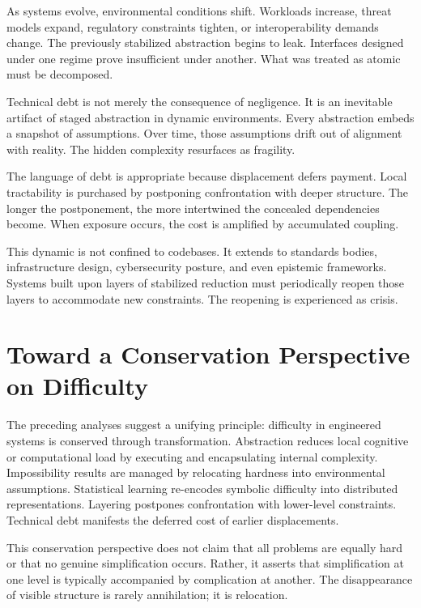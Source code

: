 \documentclass[11pt]{article}
\begin{document}
As systems evolve, environmental conditions shift. Workloads increase, threat models expand, regulatory constraints tighten, or interoperability demands change. The previously stabilized abstraction begins to leak. Interfaces designed under one regime prove insufficient under another. What was treated as atomic must be decomposed.

Technical debt is not merely the consequence of negligence. It is an inevitable artifact of staged abstraction in dynamic environments. Every abstraction embeds a snapshot of assumptions. Over time, those assumptions drift out of alignment with reality. The hidden complexity resurfaces as fragility.

The language of debt is appropriate because displacement defers payment. Local tractability is purchased by postponing confrontation with deeper structure. The longer the postponement, the more intertwined the concealed dependencies become. When exposure occurs, the cost is amplified by accumulated coupling.

This dynamic is not confined to codebases. It extends to standards bodies, infrastructure design, cybersecurity posture, and even epistemic frameworks. Systems built upon layers of stabilized reduction must periodically reopen those layers to accommodate new constraints. The reopening is experienced as crisis.

\section{Toward a Conservation Perspective on Difficulty}

The preceding analyses suggest a unifying principle: difficulty in engineered systems is conserved through transformation. Abstraction reduces local cognitive or computational load by executing and encapsulating internal complexity. Impossibility results are managed by relocating hardness into environmental assumptions. Statistical learning re-encodes symbolic difficulty into distributed representations. Layering postpones confrontation with lower-level constraints. Technical debt manifests the deferred cost of earlier displacements.

This conservation perspective does not claim that all problems are equally hard or that no genuine simplification occurs. Rather, it asserts that simplification at one level is typically accompanied by complication at another. The disappearance of visible structure is rarely annihilation; it is relocation.
\end{document}
